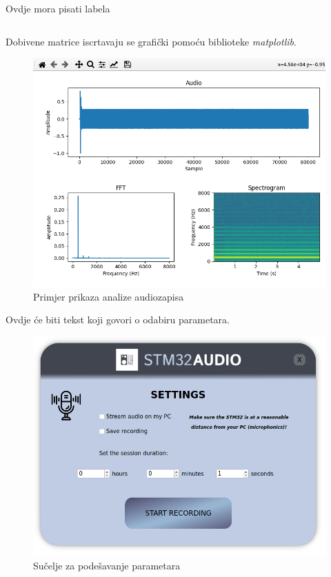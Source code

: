 \begin{code}
	Ovdje mora pisati labela
	\inputminted[firstline=37, lastline=40]{python}{../BlueSTSDK_Python/blue_st_examples/analysis.py}
	\label{fft}
\end{code}



Dobivene matrice iscrtavaju se grafički pomoću biblioteke \textit{matplotlib}.

\begin{figure}[ht]
	\includegraphics[width=\linewidth]{imgs/analyse_example}
	\caption{Primjer prikaza analize audiozapisa}
	\label{fig:analyse_example}
\end{figure}

Ovdje će biti tekst koji govori o odabiru parametara.

\begin{figure}[ht]
	\includegraphics[width=\linewidth]{imgs/params_form}
	\caption{Sučelje za podešavanje parametara}
	\label{fig:params_form}
\end{figure}

